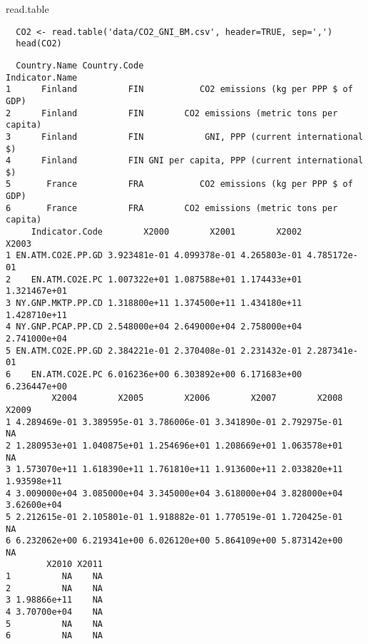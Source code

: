 \documentclass[xcolor={usenames,svgnames,dvipsnames}]{beamer}
\begin{document}
\begin{frame}[fragile,label=sec-1-2-2]{read.table}
 \lstset{language=R,label= ,caption= ,numbers=none}
\begin{lstlisting}
  CO2 <- read.table('data/CO2_GNI_BM.csv', header=TRUE, sep=',')
  head(CO2)
\end{lstlisting}

\begin{verbatim}
  Country.Name Country.Code                                Indicator.Name
1      Finland          FIN           CO2 emissions (kg per PPP $ of GDP)
2      Finland          FIN        CO2 emissions (metric tons per capita)
3      Finland          FIN            GNI, PPP (current international $)
4      Finland          FIN GNI per capita, PPP (current international $)
5       France          FRA           CO2 emissions (kg per PPP $ of GDP)
6       France          FRA        CO2 emissions (metric tons per capita)
     Indicator.Code        X2000        X2001        X2002        X2003
1 EN.ATM.CO2E.PP.GD 3.923481e-01 4.099378e-01 4.265803e-01 4.785172e-01
2    EN.ATM.CO2E.PC 1.007322e+01 1.087588e+01 1.174433e+01 1.321467e+01
3 NY.GNP.MKTP.PP.CD 1.318800e+11 1.374500e+11 1.434180e+11 1.428710e+11
4 NY.GNP.PCAP.PP.CD 2.548000e+04 2.649000e+04 2.758000e+04 2.741000e+04
5 EN.ATM.CO2E.PP.GD 2.384221e-01 2.370408e-01 2.231432e-01 2.287341e-01
6    EN.ATM.CO2E.PC 6.016236e+00 6.303892e+00 6.171683e+00 6.236447e+00
         X2004        X2005        X2006        X2007        X2008       X2009
1 4.289469e-01 3.389595e-01 3.786006e-01 3.341890e-01 2.792975e-01          NA
2 1.280953e+01 1.040875e+01 1.254696e+01 1.208669e+01 1.063578e+01          NA
3 1.573070e+11 1.618390e+11 1.761810e+11 1.913600e+11 2.033820e+11 1.93598e+11
4 3.009000e+04 3.085000e+04 3.345000e+04 3.618000e+04 3.828000e+04 3.62600e+04
5 2.212615e-01 2.105801e-01 1.918882e-01 1.770519e-01 1.720425e-01          NA
6 6.232062e+00 6.219341e+00 6.026120e+00 5.864109e+00 5.873142e+00          NA
        X2010 X2011
1          NA    NA
2          NA    NA
3 1.98866e+11    NA
4 3.70700e+04    NA
5          NA    NA
6          NA    NA
\end{verbatim}
\end{frame}
\end{document}
